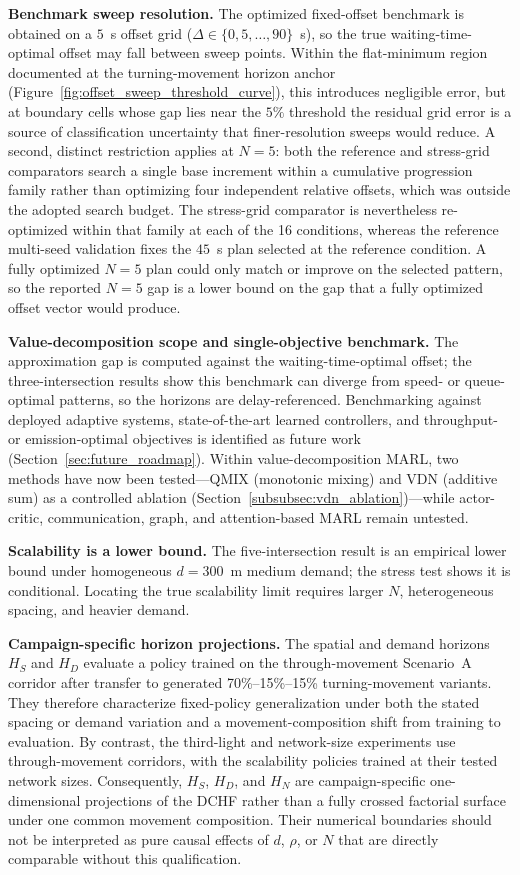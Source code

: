 \documentclass[review,12pt]{elsarticle}
\begin{document}
\textbf{Benchmark sweep resolution.} The optimized fixed-offset benchmark is obtained on a $5$~s offset grid ($\Delta\in\{0,5,\ldots,90\}$~s), so the true waiting-time-optimal offset may fall between sweep points. Within the flat-minimum region documented at the turning-movement horizon anchor (Figure~\ref{fig:offset_sweep_threshold_curve}), this introduces negligible error, but at boundary cells whose gap lies near the $5\%$ threshold the residual grid error is a source of classification uncertainty that finer-resolution sweeps would reduce. A second, distinct restriction applies at $N=5$: both the reference and stress-grid comparators search a single base increment within a cumulative progression family rather than optimizing four independent relative offsets, which was outside the adopted search budget. The stress-grid comparator is nevertheless re-optimized within that family at each of the 16 conditions, whereas the reference multi-seed validation fixes the $45$~s plan selected at the reference condition. A fully optimized $N=5$ plan could only match or improve on the selected pattern, so the reported $N=5$ gap is a lower bound on the gap that a fully optimized offset vector would produce.

\textbf{Value-decomposition scope and single-objective benchmark.} The approximation gap is computed against the waiting-time-optimal offset; the three-intersection results show this benchmark can diverge from speed- or queue-optimal patterns, so the horizons are delay-referenced. Benchmarking against deployed adaptive systems, state-of-the-art learned controllers, and throughput- or emission-optimal objectives is identified as future work (Section~\ref{sec:future_roadmap}). Within value-decomposition MARL, two methods have now been tested---QMIX (monotonic mixing) and VDN (additive sum) as a controlled ablation (Section~\ref{subsubsec:vdn_ablation})---while actor-critic, communication, graph, and attention-based MARL remain untested.

\textbf{Scalability is a lower bound.} The five-intersection result is an empirical lower bound under homogeneous $d=300$~m medium demand; the stress test shows it is conditional. Locating the true scalability limit requires larger $N$, heterogeneous spacing, and heavier demand.

\textbf{Campaign-specific horizon projections.}
The spatial and demand horizons $H_S$ and $H_D$ evaluate a policy
trained on the through-movement Scenario~A corridor after transfer to
generated 70\%--15\%--15\% turning-movement variants. They therefore
characterize fixed-policy generalization under both the stated spacing or
demand variation and a movement-composition shift from training to
evaluation. By contrast, the third-light and network-size experiments
use through-movement corridors, with the scalability policies trained at
their tested network sizes. Consequently, $H_S$, $H_D$, and $H_N$ are
campaign-specific one-dimensional projections of the DCHF rather than a
fully crossed factorial surface under one common movement composition.
Their numerical boundaries should not be interpreted as pure causal
effects of $d$, $\rho$, or $N$ that are directly comparable without this
qualification.
\end{document}
